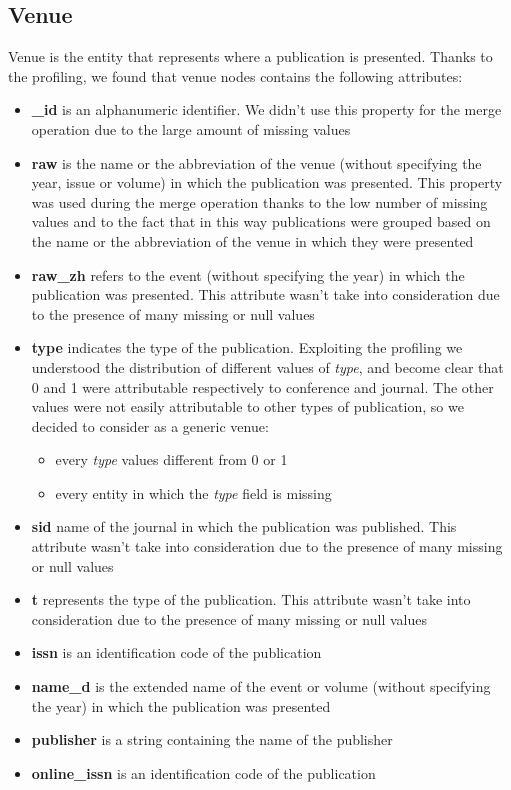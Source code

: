 \documentclass{Configuration_Files/PoliMi3i_thesis}
\begin{document}
\subsection{Venue}
Venue is the entity that represents where a publication is presented. Thanks to the profiling, we found that venue nodes contains
the following attributes:
\begin{itemize}
    \item \textbf{\_id} is an alphanumeric identifier. We didn't use this property for the merge operation due to the large
            amount of missing values
    \item \textbf{raw} is the name or the abbreviation of the venue (without specifying the year, issue or volume) in which the
            publication was presented. This property was used during the merge operation thanks to the low number of missing
            values and to the fact that in this way publications were grouped based on the name or the abbreviation
            of the venue in which they were presented
    \item \textbf{raw\_zh} refers to the event (without specifying the year) in which the publication was presented. 
            This attribute wasn't take into consideration due to the presence of many missing or null values
    \item \textbf{type} indicates the type of the publication. Exploiting the profiling we understood the distribution
            of different values of \emph{type}, and become clear that 0 and 1 were attributable respectively to conference
            and journal. The other values were not easily attributable to other types of publication, so we decided to consider
            as a generic venue:
            \begin{itemize}
                \item every \emph{type} values different from 0 or 1
                \item every entity in which the \emph{type} field is missing
            \end{itemize} 
    \item \textbf{sid} name of the journal in which the publication was published. This attribute wasn't take into
            consideration due to the presence of many missing or null values
    \item \textbf{t} represents the type of the publication. This attribute wasn't take into consideration due to the
            presence of many missing or null values
    \item \textbf{issn} is an identification code of the publication
    \item \textbf{name\_d} is the extended name of the event or volume (without specifying the year) in which the
            publication was presented
    \item \textbf{publisher} is a string containing the name of the publisher
    \item \textbf{online\_issn} is an identification code of the publication
\end{itemize}
\end{document}
